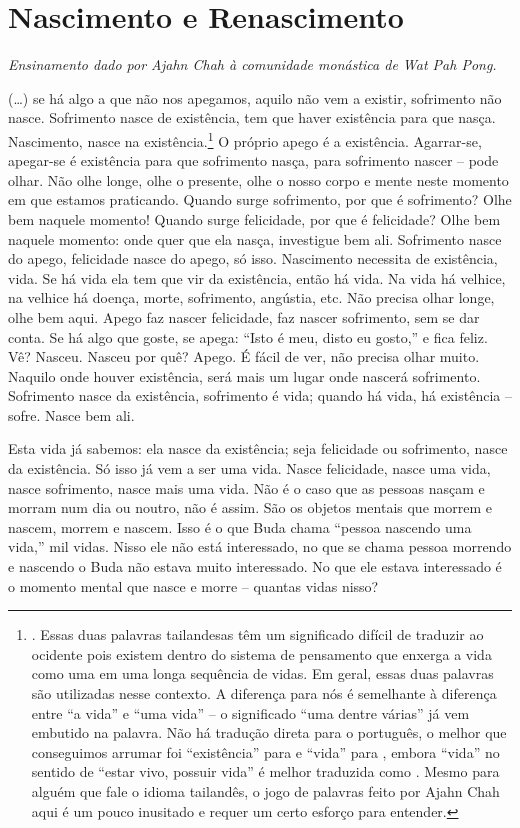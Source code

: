 
\chapter{Nascimento e Renascimento}

{\itshape
Ensinamento dado por Ajahn Chah à comunidade monástica de Wat Pah Pong.}

(…) se há algo a que não nos apegamos, aquilo não vem a existir,
sofrimento não nasce. Sofrimento nasce de existência, tem que haver
existência para que nasça. Nascimento, nasce na
existência.\footnote{. Essas duas
palavras tailandesas têm um significado difícil de traduzir ao ocidente
pois existem dentro do sistema de pensamento que enxerga a vida como
uma em uma longa sequência de vidas. Em geral, essas duas palavras são
utilizadas nesse contexto. A diferença para nós é semelhante à
diferença entre “a vida” e “uma vida” -- o significado “uma dentre
várias” já vem embutido na palavra. Não há tradução direta para o
português, o melhor que conseguimos arrumar foi “existência” para
 e “vida” para , embora “vida” no
sentido de “estar vivo, possuir vida” é melhor traduzida como
. Mesmo para alguém que fale o idioma
tailandês, o jogo de palavras feito por Ajahn Chah aqui é um pouco
inusitado e requer um certo esforço para entender.} O próprio apego é
a existência. Agarrar-se, apegar-se é existência para que sofrimento
nasça, para sofrimento nascer – pode olhar. Não olhe longe, olhe o
presente, olhe o nosso corpo e mente neste momento em que estamos
praticando. Quando surge sofrimento, por que é sofrimento? Olhe bem
naquele momento! Quando surge felicidade, por que é felicidade? Olhe
bem naquele momento: onde quer que ela nasça, investigue bem ali.
Sofrimento nasce do apego, felicidade nasce do apego, só isso.
Nascimento necessita de existência, vida. Se há vida ela tem que vir da
existência, então há vida. Na vida há velhice, na velhice há doença,
morte, sofrimento, angústia, etc. Não precisa olhar longe, olhe bem
aqui. Apego faz nascer felicidade, faz nascer sofrimento, sem se dar
conta. Se há algo que goste, se apega: “Isto é meu, disto eu gosto,” e
fica feliz. Vê? Nasceu. Nasceu por quê? Apego. É fácil de ver, não
precisa olhar muito. Naquilo onde houver existência, será mais um lugar
onde nascerá sofrimento. Sofrimento nasce da existência, sofrimento é
vida; quando há vida, há existência – sofre. Nasce bem ali. 

Esta vida já sabemos: ela nasce da existência; seja felicidade ou
sofrimento, nasce da existência. Só isso já vem a ser uma vida. Nasce
felicidade, nasce uma vida, nasce sofrimento, nasce mais uma vida. Não
é o caso que as pessoas nasçam e morram num dia ou noutro, não é assim.
São os objetos mentais que morrem e nascem, morrem e nascem. Isso é o
que Buda chama “pessoa nascendo uma vida,” mil vidas. Nisso ele não
está interessado, no que se chama pessoa morrendo e nascendo o Buda não
estava muito interessado. No que ele estava interessado é o momento
mental que nasce e morre – quantas vidas nisso? 

